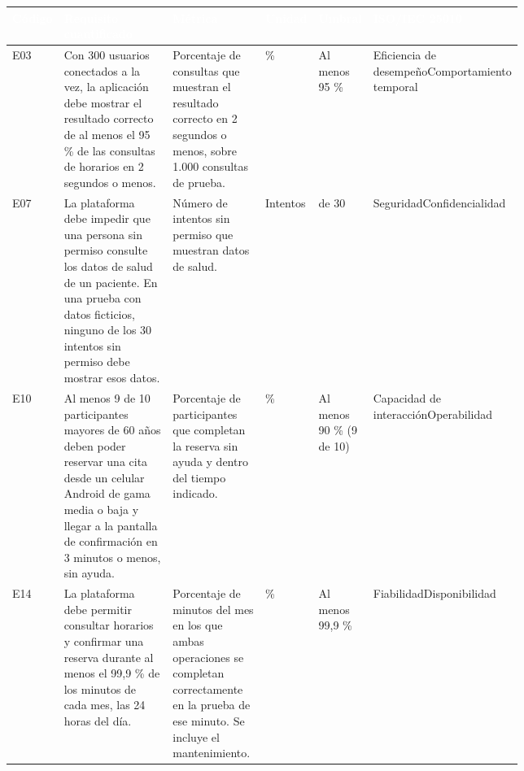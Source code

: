 \documentclass[11pt,a4paper]{article}
\newcommand{\cabeceraTabla}[1]{\textcolor{white}{\textbf{#1}}}
\begin{document}
{\small
\setlength{\tabcolsep}{4pt}
\renewcommand{\arraystretch}{1.1}
\begin{longtable}
  {|>{\raggedright\arraybackslash}p{0.07\linewidth}
   |>{\raggedright\arraybackslash}p{0.29\linewidth}
   |>{\raggedright\arraybackslash}p{0.19\linewidth}
   |>{\raggedright\arraybackslash}p{0.08\linewidth}
   |>{\raggedright\arraybackslash}p{0.10\linewidth}
   |>{\raggedright\arraybackslash}p{}|}
  \hline
  \rowcolor{VerdeTabla}
  \cabeceraTabla{Código} & \cabeceraTabla{Requisito cuantificado} &
  \cabeceraTabla{Métrica} & \cabeceraTabla{Unidad} & \cabeceraTabla{Umbral} &
  \cabeceraTabla{ISO/IEC 25010}
  \\ \hline
  \endhead

  E03 & Con 300 usuarios conectados a la vez, la aplicación debe mostrar el
  resultado correcto de al menos el 95 \% de las consultas de horarios en 2
  segundos o menos.
  & Porcentaje de consultas que muestran el resultado correcto en 2 segundos o
  menos, sobre 1.000 consultas de prueba.
  & \% & Al menos 95 \%
  & Eficiencia de desempeño\newline Comportamiento temporal \\ \hline

  \rowcolor{gray!12}
  E07 & La plataforma debe impedir que una persona sin permiso consulte los
  datos de salud de un paciente. En una prueba con datos ficticios, ninguno
  de los 30 intentos sin permiso debe mostrar esos datos.
  & Número de intentos sin permiso que muestran datos de salud.
  & Intentos & 0 de 30
  & Seguridad\newline Confidencialidad \\ \hline

  E10 & Al menos 9 de 10 participantes mayores de 60 años deben poder reservar
  una cita desde un celular Android de gama media o baja y llegar a la
  pantalla de confirmación en 3 minutos o menos, sin ayuda.
  & Porcentaje de participantes que completan la reserva sin ayuda y dentro
  del tiempo indicado.
  & \% & Al menos 90 \% (9 de 10)
  & Capacidad de interacción\newline Operabilidad \\ \hline

  \rowcolor{gray!12}
  E14 & La plataforma debe permitir consultar horarios y confirmar una reserva
  durante al menos el 99,9 \% de los minutos de cada mes, las 24 horas del
  día.
  & Porcentaje de minutos del mes en los que ambas operaciones se completan
  correctamente en la prueba de ese minuto. Se incluye el mantenimiento.
  & \% & Al menos 99,9 \%
  & Fiabilidad\newline Disponibilidad \\ \hline


\end{longtable}}
\end{document}
